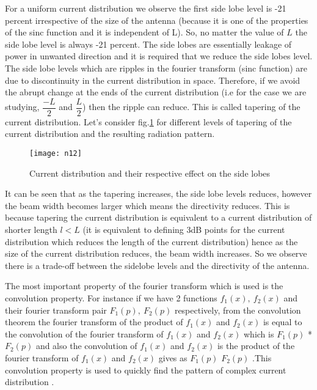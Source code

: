 For a uniform current distribution we observe the first side lobe level is -21 percent irrespective of the size of the antenna (because it is one of the properties of the sinc function and it is independent of L). So, no matter the value of $L$ the side lobe level is always -21 percent. The side lobes are essentially leakage of power in unwanted direction and it is required that we reduce the side lobes level. The side lobe levels which are ripples in the fourier transform (sinc function) are due to discontinuity in the current distribution in space. Therefore, if we avoid the abrupt change at the ends of the current distribution (i.e for the case we are studying, $\dfrac{-L}{2}$ and $\dfrac{L}{2}$) then the ripple can reduce. This is called tapering of the current distribution. Let's consider fig.\ref{fig12} for different levels of tapering of the current distribution and the resulting radiation pattern.

\begin{figure}
	\centering
	\texttt{[image: n12]}
	\caption{Current distribution and their respective effect on the side lobes}
	\label{fig12}
\end{figure}

It can be seen that as the tapering increases, the side lobe levels reduces, however the beam width becomes larger which means the directivity reduces. This is because tapering the current distribution is equivalent to a current distribution of shorter length $l < L$ (it is equivalent to defining 3dB points for the current distribution which reduces the length of the current distribution) hence as the size of the current distribution reduces, the beam width increases. So we observe there is a trade-off between the sidelobe levels and the directivity of the antenna.


The most important property of the fourier transform which is used is the convolution property. For instance if we have 2 functions $f_{1}(x),\ f_2(x)$ and
their fourier transform pair $F_1(p),\ F_2(p)$ respectively, from the convolution theorem the fourier transform of the product of $f_{1}(x)$ and $f_{2}(x)$ is equal to the convolution of the fourier transform of $f_1(x)$ and $f_2(x)$ which is $F_{1}(p)$ * $F_{2}(p)$ and also the convolution of $f_{1}(x)$ and $f_{2}(x)$ is the product of the fourier transform of $f_{1}(x)$ and $f_{2}(x)$ gives as $F_{1}(p)$ $F_{2}(p)$ .This convolution property is used to quickly find the pattern of complex current distribution .


